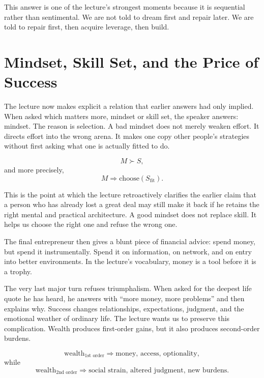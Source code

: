 This answer is one of the lecture's strongest moments because it is sequential rather than sentimental. We are not told to dream first and repair later. We are told to repair first, then acquire leverage, then build.

\section{Mindset, Skill Set, and the Price of Success}

The lecture now makes explicit a relation that earlier answers had only implied. When asked which matters more, mindset or skill set, the speaker answers: mindset. The reason is selection. A bad mindset does not merely weaken effort. It directs effort into the wrong arena. It makes one copy other people's strategies without first asking what one is actually fitted to do.

\begin{equation}
M \succ S,
\end{equation}
and more precisely,
\begin{equation}
M \Rightarrow \text{choose}(S_{\text{fit}}).
\end{equation}

This is the point at which the lecture retroactively clarifies the earlier claim that a person who has already lost a great deal may still make it back if he retains the right mental and practical architecture. A good mindset does not replace skill. It helps us choose the right one and refuse the wrong one.

The final entrepreneur then gives a blunt piece of financial advice: spend money, but spend it instrumentally. Spend it on information, on network, and on entry into better environments. In the lecture's vocabulary, money is a tool before it is a trophy.

The very last major turn refuses triumphalism. When asked for the deepest life quote he has heard, he answers with ``more money, more problems'' and then explains why. Success changes relationships, expectations, judgment, and the emotional weather of ordinary life. The lecture wants us to preserve this complication. Wealth produces first-order gains, but it also produces second-order burdens.

\begin{equation}
\text{wealth}_{1\text{st order}} \Rightarrow \text{money, access, optionality},
\end{equation}
while
\begin{equation}
\text{wealth}_{2\text{nd order}} \Rightarrow \text{social strain, altered judgment, new burdens}.
\end{equation}

